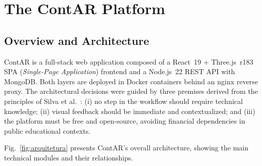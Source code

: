 \documentclass[conference]{IEEEtran}
\begin{document}
\section{The ContAR Platform}

\subsection{Overview and Architecture}

ContAR is a full-stack web application composed of a React~19 + Three.js~r183
SPA (\textit{Single-Page Application}) frontend and a Node.js~22 REST API with
MongoDB. Both layers are deployed in Docker containers behind an nginx
reverse proxy. The architectural decisions were guided by three premises
derived from the principles of Silva et al.~\cite{silva2023}: (i) no step in
the workflow should require technical knowledge; (ii) visual feedback should
be immediate and contextualized; and (iii) the platform must be free and
open-source, avoiding financial dependencies in public educational contexts.

Fig.~\ref{fig:arquitetura} presents ContAR's overall architecture, showing the
main technical modules and their relationships.
\end{document}
